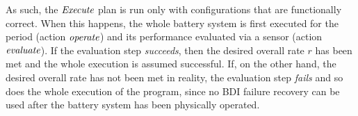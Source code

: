 As such, the $\operatorname{\textit{Execute}}$ plan is run only with configurations that are functionally correct.
%
When this happens, the whole battery system is first executed for the period (action $\operatorname{\textit{operate}}$) and its performance evaluated via a sensor (action $\operatorname{\textit{evaluate}}$). If the evaluation step \emph{succeeds}, then the desired overall rate $r$ has been met and the whole execution is assumed successful. If, on the other hand, the desired overall rate has not been met in reality, the evaluation step \emph{fails} and so does the whole execution of the program, since no BDI failure recovery can be used after the battery system has been physically operated. 












